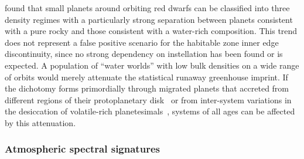 \documentclass[twocolumn,twocolappendix]{aastex631}
\begin{document}
\citet{Luque2022} found that small planets around orbiting red dwarfs can be classified into three density regimes with a particularly strong separation between planets consistent with a pure rocky and those consistent with a water-rich composition.
This trend does not represent a false positive scenario for the habitable zone inner edge discontinuity, since no strong dependency on instellation has been found or is expected.
A population of ``water worlds'' with low bulk densities on a wide range of orbits would merely attenuate the statistical runaway greenhouse imprint.
If the dichotomy forms primordially through migrated planets that accreted from different regions of their protoplanetary disk~\citep{Venturini2020,Burn2021,Schlecker2021,Schlecker2021b} or from inter-system variations in the desiccation of volatile-rich planetesimals~\citep{Lichtenberg2019,2021Sci...371..365L,2021ApJ...913L..20L,2022ApJ...938L...3L,2023NatAs...7...39B}, systems of all ages can be affected by this attenuation.

\subsubsection{Atmospheric spectral signatures}\label{sec:dis_atmospheres}
\end{document}
